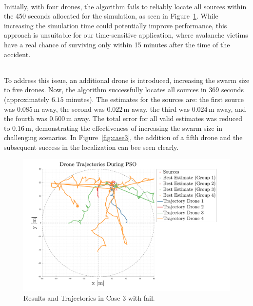 \noindent\\
Initially, with four drones, the algorithm fails to reliably 
locate all sources within the 450 seconds allocated for the simulation,
as seen in Figure~\ref{fig:case3fail}. 
While increasing the simulation time could potentially improve performance, 
this approach is unsuitable for our time-sensitive application, where
avalanche victims have a real chance of surviving only within 15 minutes
after the time of the accident.

\noindent\\
To address this issue, an additional drone is introduced, increasing the 
swarm size to five drones. Now, the algorithm successfully 
locates all sources in 369 seconds (approximately \(6.15\) minutes). 
The estimates for the sources are: the first source was \(0.085 \, \text{m}\) away, 
the second was \(0.022 \, \text{m}\) away, the third was \(0.024 \, \text{m}\) away, and the 
fourth was \(0.500 \, \text{m}\) away. The total error for all valid estimates was 
reduced to \(0.16 \, \text{m}\), demonstrating the effectiveness of increasing the 
swarm size in challenging scenarios.
In Figure~\ref{fig:case3}, the addition of a fifth drone and the subsequent 
success in the localization can bee seen clearly.

\begin{figure}
    \centering
    \includegraphics[width=1.06\textwidth]{images/case_3_fail.pdf}
    \caption[PSO Case 3]{Results and Trajectories in Case 3 with fail.}
    \label{fig:case3fail}
\end{figure}



